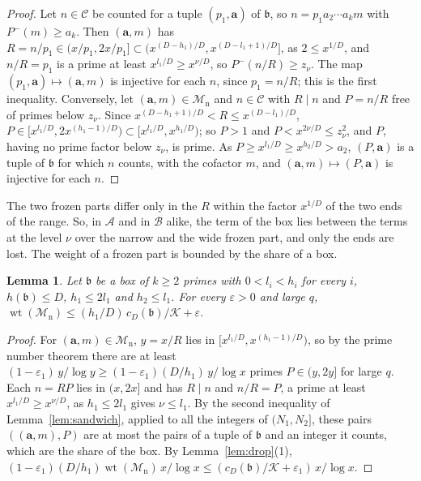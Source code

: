 \documentclass[11pt]{article}
\newtheorem{lemma}[theorem]{Lemma}
\theoremstyle{definition}
\begin{document}
\begin{proof}
Let $n \in \mathcal C$ be counted for a tuple $(p_1, \mathbf a)$ of $\mathfrak b$, so $n = p_1 a_2 \cdots a_k m$ with
$P^-(m) \ge a_k$. Then $(\mathbf a, m)$ has $R = n/p_1 \in (x/p_1, 2x/p_1] \subset (x^{(D - h_1)/D}, x^{(D - l_1 +
1)/D}]$,
as $2 \le x^{1/D}$, and $n/R = p_1$ is a prime at least $x^{l_1/D} \ge x^{\nu/D}$, so $P^-(n/R) \ge z_\nu$. The map
$(p_1,
\mathbf a) \mapsto (\mathbf a, m)$ is injective for each $n$, since $p_1 = n/R$; this is the first inequality.
Conversely, let $(\mathbf a, m) \in \mathcal M_{\mathrm n}$ and $n \in \mathcal C$ with $R \mid n$ and $P = n/R$ free of
primes below $z_\nu$. Since $x^{(D - h_1 + 1)/D} < R \le x^{(D - l_1)/D}$, $P \in [x^{l_1/D}, 2x^{(h_1 - 1)/D}) \subset
[x^{l_1/D}, x^{h_1/D})$; so $P > 1$ and $P < x^{2\nu/D} \le z_\nu^2$, and $P$, having no prime factor below $z_\nu$, is
prime. As $P \ge x^{l_1/D} \ge x^{h_2/D} > a_2$, $(P, \mathbf a)$ is a tuple of $\mathfrak b$ for which $n$ counts, with
the cofactor $m$, and $(\mathbf a, m) \mapsto (P, \mathbf a)$ is injective for each $n$.
\end{proof}

The two frozen parts differ only in the $R$ within the factor $x^{1/D}$ of the two ends of the range. So, in
$\mathcal A$ and in $\mathcal B$ alike, the term of the box lies between the terms at the level $\nu$ over the narrow
and the wide frozen part, and only the ends are lost. The weight of a frozen part is bounded by the share of a box.

\begin{lemma}\label{lem:frozen-weight}
Let $\mathfrak b$ be a box of $k \ge 2$ primes with $0 < l_i < h_i$ for every $i$, $h(\mathfrak b) \le D$, $h_1 \le
2l_1$ and $h_2 \le l_1$. For every $\varepsilon > 0$
and large $q$, $\operatorname{wt}(\mathcal M_{\mathrm n}) \le (h_1/D)\, c_D(\mathfrak b)/\mathcal K + \varepsilon$.
\end{lemma}

\begin{proof}
For $(\mathbf a, m) \in \mathcal M_{\mathrm n}$, $y = x/R$ lies in $[x^{l_1/D}, x^{(h_1 - 1)/D})$, so by the prime
number
theorem there are at least $(1 - \varepsilon_1)\, y/\log y \ge (1 - \varepsilon_1)(D/h_1)\, y/\log x$ primes $P \in (y,
2y]$ for large $q$. Each $n = RP$ lies in $(x, 2x]$ and has $R \mid n$ and $n/R = P$, a prime at least $x^{l_1/D} \ge
x^{\nu/D}$, as $h_1 \le 2l_1$ gives $\nu \le l_1$. By the second inequality of Lemma~\ref{lem:sandwich}, applied to all
the integers of $(N_1, N_2]$, these pairs $((\mathbf a, m), P)$ are at most the pairs of a tuple of $\mathfrak b$ and an
integer it counts, which are the share of the box. By Lemma~\ref{lem:drop}(1), $(1 - \varepsilon_1)(D/h_1)
\operatorname{wt}(\mathcal M_{\mathrm n})\, x/\log x \le (c_D(\mathfrak b)/\mathcal K + \varepsilon_1)\, x/\log x$.
\end{proof}
\end{document}
